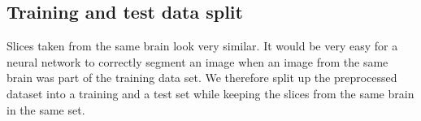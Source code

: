 \subsection{Training and test data split}

Slices taken from the same brain look very similar. It would be very easy for a neural network to correctly segment an image when an image from the same brain was part of the training data set.
We therefore split up the preprocessed dataset into a training and a test set while keeping the slices from the same brain in the same set.
